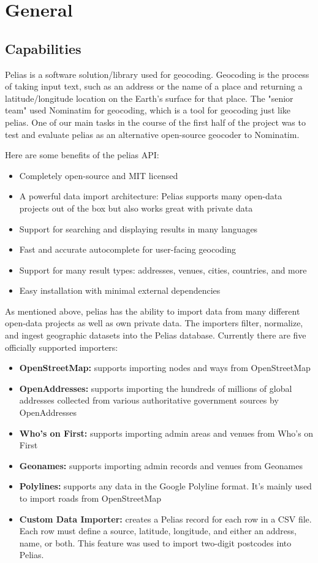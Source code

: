

\section{General}
\subsection{Capabilities}
Pelias is a software solution/library used for geocoding. Geocoding is the process of taking input text, such as an address or the name of a place and returning a latitude/longitude location on the Earth's surface for that place.
The "senior team" used Nominatim for geocoding, which is a tool for geocoding just like pelias. One of our main tasks  in the course of the first half of the project was to test and evaluate pelias as an alternative open-source geocoder to Nominatim.

Here are some benefits of the pelias API:
\begin{itemize}
\item Completely open-source and MIT licensed
\item A powerful data import architecture: Pelias supports many open-data projects out of the box but also works great with private data
\item Support for searching and displaying results in many languages
\item Fast and accurate autocomplete for user-facing geocoding
\item Support for many result types: addresses, venues, cities, countries, and more
\item Easy installation with minimal external dependencies
\end{itemize}

As mentioned above, pelias has the ability to import data from many different open-data projects as well as own private data. The importers filter, normalize, and ingest geographic datasets into the Pelias database. Currently there are five officially supported importers:

\begin{itemize}
\item \textbf{OpenStreetMap:} supports importing nodes and ways from OpenStreetMap
\item \textbf{OpenAddresses:} supports importing the hundreds of millions of global addresses collected from various authoritative government sources by OpenAddresses
\item \textbf{Who's on First:} supports importing admin areas and venues from Who's on First
\item \textbf{Geonames:} supports importing admin records and venues from Geonames
\item \textbf{Polylines:} supports any data in the Google Polyline format. It's mainly used to import roads from OpenStreetMap
\item \textbf{Custom Data Importer:} creates a Pelias record for each row in a CSV file. Each row must define a source, latitude, longitude, and either an address, name, or both. This feature was used to import two-digit postcodes into Pelias.
\end{itemize}


